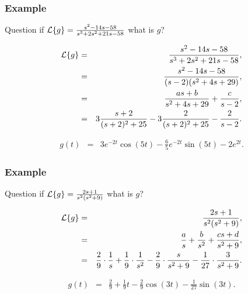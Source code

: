 \begin{frame}
  \frametitle{Example}

  \begin{block}{Question}
    if $\laplace{g}=\frac{s^2-14s-58}{s^3+2s^2+21s-58}$ what is $g$?
  \end{block}

    {
      \begin{eqnarray*}
        \laplace{g} & = & \frac{s^2-14s-58}{s^3+2s^2+21s-58}, \\
        & = & \frac{s^2-14s-58}{(s-2)(s^2+4s+29)}, \\
        & = & \frac{as+b}{s^2+4s+29}+\frac{c}{s-2}, \\
        & = & 3\frac{s+2}{(s+2)^2+25} - 3\frac{2}{(s+2)^2+25}-\frac{2}{s-2}.
      \end{eqnarray*}
    }

    {
      \begin{eqnarray*}
        g(t) & = & 3e^{-2t}\cos(5t) - \frac{6}{5}e^{-2t}\sin(5t)-2e^{2t}.
      \end{eqnarray*}
    }
  

\end{frame}


\begin{frame}
  \frametitle{Example}

  \begin{block}{Question}
    if $\laplace{g}=\frac{2s+1}{s^2(s^2+9)}$ what is $g$?
  \end{block}

    {
      \begin{eqnarray*}
        \laplace{g} & = & \frac{2s+1}{s^2(s^2+9)}, \\
        & = & \frac{a}{s}+\frac{b}{s^2} + \frac{cs+d}{s^2+9}, \\
        & = & \frac{2}{9}\cdot\frac{1}{s} + \frac{1}{9}\cdot\frac{1}{s^2}-\frac{2}{9}\cdot\frac{s}{s^2+9}-\frac{1}{27}\cdot\frac{3}{s^2+9}.
      \end{eqnarray*}
    }

    {
      \begin{eqnarray*}
        g(t) & = & \frac{2}{9} + \frac{1}{9}t - \frac{2}{9}\cos(3t) - \frac{1}{27} \sin(3t).
      \end{eqnarray*}
    }
  

\end{frame}


